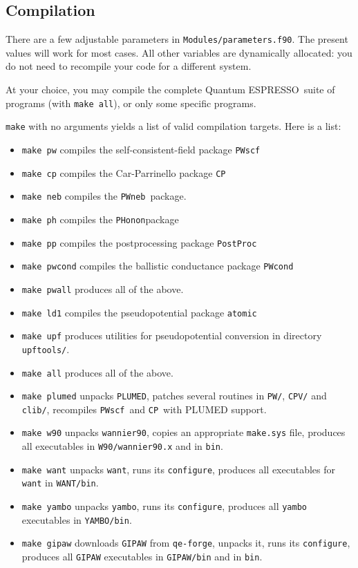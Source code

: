 \documentclass[12pt,a4paper]{article}
\def\qe{{\sc Quantum ESPRESSO}}
\def\configure{\texttt{configure}}
\def\PWscf{\texttt{PWscf}}
\def\PHonon{\texttt{PHonon}}
\def\CP{\texttt{CP}}
\def\PostProc{\texttt{PostProc}}
\def\NEB{\texttt{PWneb}} %
\begin{document}
\subsection{Compilation}

There are a few adjustable parameters in \texttt{Modules/parameters.f90}. 
The
present values will work for most cases. All other variables are dynamically
allocated: you do not need to recompile your code for a different system.
    
At your choice, you may compile the complete \qe\ suite of programs 
(with \texttt{make all}), or only some specific programs.

\texttt{make} with no arguments yields a list of valid compilation targets. 
Here is a list:
\begin{itemize}
\item \texttt{make pw}  compiles the self-consistent-field package \PWscf
\item \texttt{make cp}  compiles the Car-Parrinello package \CP
\item \texttt{make neb} compiles the \NEB\ package.
\item \texttt{make ph}  compiles the \PHonon package
\item \texttt{make pp}  compiles the postprocessing package \PostProc
\item \texttt{make pwcond} compiles the ballistic conductance package 
                           \texttt{PWcond}
\item \texttt{make pwall} produces all of the above.
\item \texttt{make ld1} compiles the pseudopotential package \texttt{atomic}
\item \texttt{make upf} produces utilities for pseudopotential conversion in
                        directory \texttt{upftools/}.
\item \texttt{make all} produces all of the above.
\item \texttt{make plumed} unpacks \texttt{PLUMED}, patches several routines
                           in \texttt{PW/}, \texttt{CPV/} and \texttt{clib/},
                           recompiles \PWscf\ and \CP\ with PLUMED support.
\item \texttt{make w90} unpacks \texttt{wannier90}, copies an appropriate
                       \texttt{make.sys} file,  produces all executables
                       in \texttt{W90/wannier90.x} and in \texttt{bin}.
\item \texttt{make want} unpacks \texttt{want}, runs its \configure,
                         produces all executables for \texttt{want} in 
                         \texttt{WANT/bin}.
\item \texttt{make yambo} unpacks \texttt{yambo}, runs its \configure,
                          produces all \texttt{yambo} executables in 
                          \texttt{YAMBO/bin}.
\item \texttt{make gipaw} downloads \texttt{GIPAW} from \texttt{qe-forge},
                          unpacks it, runs its \configure,
                          produces all \texttt{GIPAW} executables in 
                          \texttt{GIPAW/bin} and in \texttt{bin}.
\end{itemize}
\end{document}
